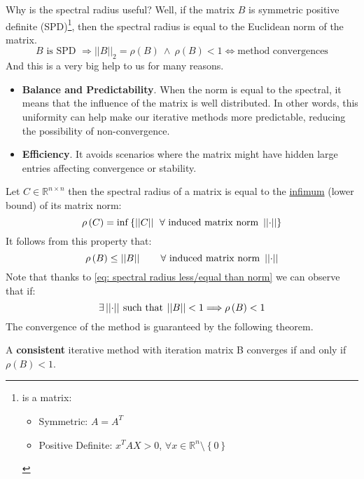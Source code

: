 \begin{itemize}
\begin{itemize}
        Why is the spectral radius useful? Well, if the matrix $B$ is symmetric positive definite (SPD)\footnote{ is a matrix: \begin{itemize}
            \item Symmetric: $A = A^{T}$
            \item Positive Definite: $x^{T}AX > 0$, $\forall x \in \mathbb{R}^{n} \setminus \left\{0\right\}$
        \end{itemize}}, then the spectral radius is equal to the Euclidean norm of the matrix.
        \begin{equation*}
            B \text{ is SPD } \Rightarrow {\left|\left|B\right|\right|}_{2} = \rho\left(B\right) \: \land \: \rho\left(B\right) < 1 \iff \text{method convergences}
        \end{equation*}
        And this is a very big help to us for many reasons.
        \begin{itemize}
            \item \textbf{Balance and Predictability}. When the norm is equal to the spectral, it means that the influence of the matrix is well distributed. In other words, this uniformity can help make our iterative methods more predictable, reducing the possibility of non-convergence.

            \item \textbf{Efficiency}. It avoids scenarios where the matrix might have hidden large entries affecting convergence or stability.
        \end{itemize}   
    \end{itemize}
\end{itemize}
\newpage
\noindent
Let $C \in \mathbb{R}^{n \times n}$ then the spectral radius of a matrix is equal to the \href{https://en.wikipedia.org/wiki/Infimum_and_supremum}{infimum} (lower bound) of its matrix norm:
\begin{equation}
    \rho\left(C\right) = \mathrm{inf}\left\{ \left|\left|C\right|\right| \:\: \forall \text{ induced matrix norm }\left|\left|\cdot\right|\right|\right\}
\end{equation}
It follows from this property that:
\begin{equation}\label{eq: spectral radius less/equal than norm}
    \rho\left(B\right) \le \left|\left|B\right|\right| \hspace{2em} \forall \text{ induced matrix norm } \left|\left|\cdot\right|\right|
\end{equation}
Note that thanks to \ref{eq: spectral radius less/equal than norm} we can observe that if:
\begin{equation*}
    \exists \left|\left|\cdot\right|\right| \: \text{such that} \: \left|\left|B\right|\right| < 1 \Longrightarrow \rho\left(B\right) < 1
\end{equation*}
The convergence of the method is guaranteed by the following theorem.

\highspace
\begin{theorem}
    A \textbf{consistent} iterative method with iteration matrix B converges if and only if $\rho\left(B\right) < 1$.
\end{theorem}
